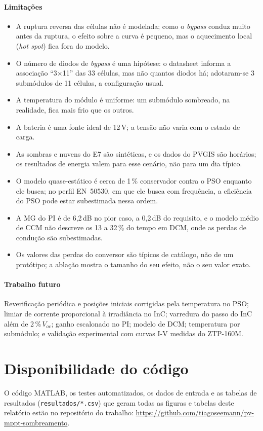 \documentclass[3p,authoryear]{elsarticle}
\begin{document}
\paragraph{Limitações}
\begin{itemize}
\item A ruptura reversa das células \citep{bishop} não é modelada; como o \emph{bypass}
conduz muito antes da ruptura, o efeito sobre a curva é pequeno, mas o aquecimento local
(\emph{hot spot}) fica fora do modelo.
\item O número de diodos de \emph{bypass} é uma hipótese: o datasheet informa a associação
``3$\times$11'' das 33 células, mas não quantos diodos há; adotaram-se 3 submódulos de 11
células, a configuração usual.
\item A temperatura do módulo é uniforme: um submódulo sombreado, na realidade, fica mais
frio que os outros.
\item A bateria é uma fonte ideal de 12\,V; a tensão não varia com o estado de carga.
\item As sombras e nuvens do E7 são sintéticas, e os dados do PVGIS são horários; os
resultados de energia valem para esse cenário, não para um dia típico.
\item O modelo quase-estático é cerca de 1\,\% conservador contra o PSO enquanto ele busca;
no perfil EN~50530, em que ele busca com frequência, a eficiência do PSO pode estar
subestimada nessa ordem.
\item A MG do PI é de 6,2\,dB no pior caso, a 0,2\,dB do requisito, e o modelo médio de CCM
não descreve os 13 a 32\,\% do tempo em DCM, onde as perdas de condução são subestimadas.
\item Os valores das perdas do conversor são típicos de catálogo, não de um protótipo; a
ablação mostra o tamanho do seu efeito, não o seu valor exato.
\end{itemize}

\paragraph{Trabalho futuro} Reverificação periódica e posições iniciais corrigidas pela
temperatura no PSO; limiar de corrente proporcional à irradiância no InC; varredura do passo
do InC além de 2\,\%\,$V_{oc}$; ganho escalonado no PI; modelo de DCM; temperatura por
submódulo; e validação experimental com curvas I-V medidas do ZTP-160M.

\section*{Disponibilidade do código}
O código MATLAB, os testes automatizados, os dados de entrada e as tabelas de resultados
(\texttt{resultados/*.csv}) que geram todas as figuras e tabelas deste relatório estão no
repositório do trabalho: \url{https://github.com/tiagoseemann/pv-mppt-sombreamento}.



\end{document}
